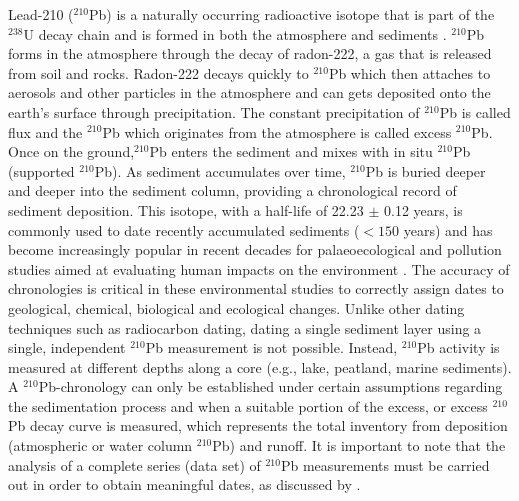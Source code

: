 \documentclass [10pt] {article}
\begin{document}
	Lead-210 ($^{210}$Pb) is a naturally occurring radioactive isotope that is part of the $^{238}$U decay chain and is formed in both the atmosphere and sediments . $^{210}$Pb forms in the atmosphere through the decay of radon-222, a gas that is released from soil and rocks. Radon-222 decays quickly to $^{210}$Pb which then attaches to aerosols and other particles in the atmosphere and can gets deposited onto the earth's surface through precipitation. The constant precipitation of $^{210}$Pb is called flux and the $^{210}$Pb which originates from the atmosphere is called excess $^{210}$Pb. Once on the ground,$^{210}$Pb enters the sediment and mixes with in situ $^{210}$Pb (supported $^{210}$Pb). As sediment accumulates over time, $^{210}$Pb is buried deeper and deeper into the sediment column, providing a chronological record of sediment deposition. This isotope, with a half-life of 22.23 $\pm$ 0.12 years, is commonly used to date recently accumulated sediments ($<150$ years) and has become increasingly popular in recent decades for palaeoecological and pollution studies aimed at evaluating human impacts on the environment \citep[e.g.,][]{Courtney2019}. The accuracy of chronologies is critical in these environmental studies to correctly assign dates to geological, chemical, biological and ecological changes. Unlike other dating techniques such as radiocarbon dating, dating a single sediment layer using a single, independent $^{210}$Pb measurement is not possible. Instead, $^{210}$Pb activity is measured at different depths along a core (e.g., lake, peatland, marine sediments). A $^{210}$Pb-chronology can only be established under certain assumptions regarding the sedimentation process and when a suitable portion of the excess, or excess $^{210}$Pb decay curve is measured, which represents the total inventory from deposition (atmospheric or water column $^{210}$Pb) and runoff. It is important to note that the analysis of a complete series (data set) of $^{210}$Pb measurements must be carried out in order to obtain meaningful dates, as discussed by \citet{Aquino2018}.


\end{document}
